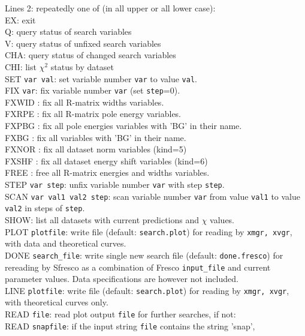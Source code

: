 \documentclass[11pt]{article}
\begin{document}
Lines 2: repeatedly one of (in all upper or all lower case):
\\ EX: exit
\\ Q: query status of search variables
\\ V: query status of unfixed search variables
\\ CHA: query status of changed search variables
\\ CHI: list $\chi^2$ status by dataset
\\ SET {\tt var val}: set variable number {\tt var} to value {\tt val}.
\\ FIX {\tt var}: fix variable number {\tt var} (set {\tt step}=0).
\\ FXWID : fix all R-matrix widths variables.
\\ FXRPE : fix all R-matrix pole energy variables.
\\ FXPBG : fix all pole energies variables with 'BG' in their name.
\\ FXBG : fix all variables with 'BG' in their name.
\\ FXNOR : fix all dataset norm variables (kind=5)
\\ FXSHF : fix all dataset energy shift variables (kind=6)
\\ FREE : free all R-matrix energies and widths variables.
\\ STEP {\tt var step}: unfix variable number {\tt var} with step {\tt step}.
\\ SCAN {\tt var val1 val2 step}: scan variable number {\tt var}
from value {\tt val1} to value {\tt val2} in steps of {\tt step}.
\\ SHOW: list all datasets with current predictions and $\chi$ values.
\\ PLOT {\tt plotfile}: write file (default: {\tt search.plot}) for reading by {\tt xmgr, xvgr},
 with data and theoretical curves.
\\ DONE  {\tt search\_file}: write single new search file (default: {\tt done.fresco}) for rereading by {\sc Sfresco} as a combination of {\sc Fresco} {\tt input\_file} and current parameter values.  Data specifications are  however not included.
 \\ LINE {\tt plotfile}: write file (default: {\tt search.plot}) for reading by {\tt xmgr, xvgr},
 with theoretical curves only.
\\ READ {\tt file}: read plot output {\tt file} for further searches, if not:
\\ READ {\tt snapfile}: if the input string {\tt file} contains the string 'snap',
\end{document}
